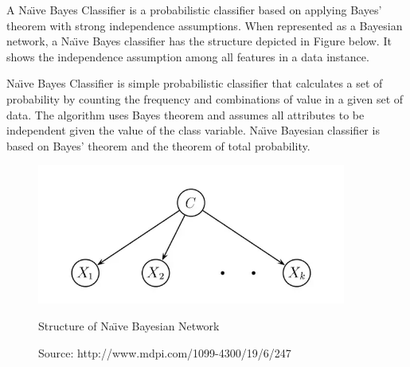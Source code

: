 \par
A Na\"{\i}ve Bayes Classifier is a probabilistic classifier based on applying Bayes’ theorem with strong independence  assumptions. When represented as a Bayesian network, a Na\"{\i}ve Bayes classifier has the structure depicted in Figure below.  \cite{friedman1997bayesian} It shows the independence assumption among all features in a data instance.
\par
Na\"{\i}ve Bayes Classifier is simple probabilistic classifier that calculates a set of probability by counting the frequency and combinations of value in a given set of data. The algorithm uses Bayes theorem and assumes all attributes to be independent given the value  of  the  class  variable. Na\"{\i}ve Bayesian classifier is based on Bayes’ theorem and the theorem of total probability. 
\newpage
\begin{figure}[bh] %
\begin{small}

	\includegraphics[width=4in]{images/naivebayesian.jpg}
	\caption{Structure of Na\"{\i}ve Bayesian Network} %
	\caption*{Source:   http://www.mdpi.com/1099-4300/19/6/247}
	\label{NB} %
\end{small}
\end{figure}




